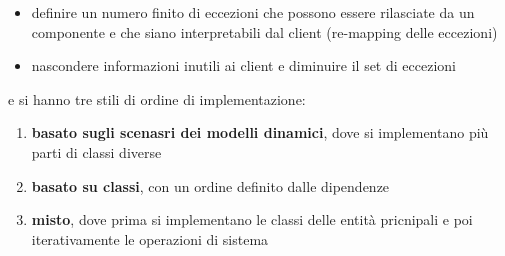 \documentclass[a4paper,12pt, oneside]{book}
\begin{document}
\begin{itemize}
\item definire un numero finito di eccezioni che possono essere rilasciate da un componente e che siano interpretabili
dal client (re-mapping delle eccezioni)
\item nascondere informazioni inutili ai client e diminuire il set di eccezioni
\end{itemize}
e si hanno tre stili di ordine di implementazione:
\begin{enumerate}
\item \textbf{basato sugli scenasri dei modelli dinamici}, dove si implementano più parti di classi diverse
\item \textbf{basato su classi}, con un ordine definito dalle dipendenze
\item \textbf{misto}, dove prima si implementano le classi delle entità pricnipali e poi iterativamente le operazioni di sistema
\end{enumerate}
\end{document}
